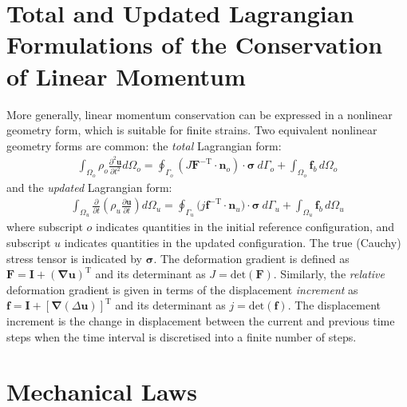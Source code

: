 \documentclass[sn-mathphys,Numbered]{sn-jnl}%
\newcommand{\bb}{\boldsymbol}
\begin{document}
\begin{appendices}


\section{Total and Updated Lagrangian Formulations of the Conservation of Linear Momentum}
\label{app:TL_UL}
More generally,  linear momentum conservation can be expressed in a nonlinear geometry form, which is suitable for finite strains.
Two equivalent nonlinear geometry forms are common: the \emph{total} Lagrangian form:
\begin{eqnarray} \label{eqn:momentum_TL}
    \int_{\Omega_o} \rho_o \frac{\partial^2 \bb{u} }{\partial t^2} d\Omega_o
    =
    \oint_{\Gamma_o} \left( J \bb{F}^{-\text{T}} \cdot \bb{n}_o \right) \cdot \bb{\sigma} \ d\Gamma_o
    + \int_{\Omega_o}  \bb{f}_b \, d\Omega_o
\end{eqnarray}
and the \emph{updated} Lagrangian form:
\begin{eqnarray} \label{eqn:momentum_UL}
    \int_{\Omega_u} \frac{\partial }{\partial t} \left( \rho_u \frac{\partial \bb{u} }{\partial t} \right) d\Omega_u
    = \oint_{\Gamma_u}(j\bb{f}^{-\text{T}}\cdot{\bb{n}_u)\cdot \bb{\sigma}}\ d\Gamma_u
    + \int_{\Omega_u}  \bb{f}_b \, d\Omega_u
\end{eqnarray}
where subscript $o$ indicates quantities in the initial reference configuration, and subscript $u$ indicates quantities in the updated configuration.
The true (Cauchy) stress tensor is indicated by $\bb{\sigma}$.
The deformation gradient is defined as $\bb{F} = \textbf{I} + (\bb{\nabla} \bb{u})^{\text{T}}$ and its determinant as $J = \text{det}(\bb{F})$.
Similarly, the \emph{relative} deformation gradient is given in terms of the displacement \emph{increment} as $\bb{f}=\textbf{I} + \left[\bb{\nabla}(\Delta \bb{u}) \right]^{\text{T}}$ and its determinant as $j = \text{det}(\bb{f})$.
The displacement increment is the change in displacement between the current and previous time steps when the time interval is discretised into a finite number of steps.



\section{Mechanical Laws}
\label{app:mechLaws}


\end{appendices}
\end{document}
